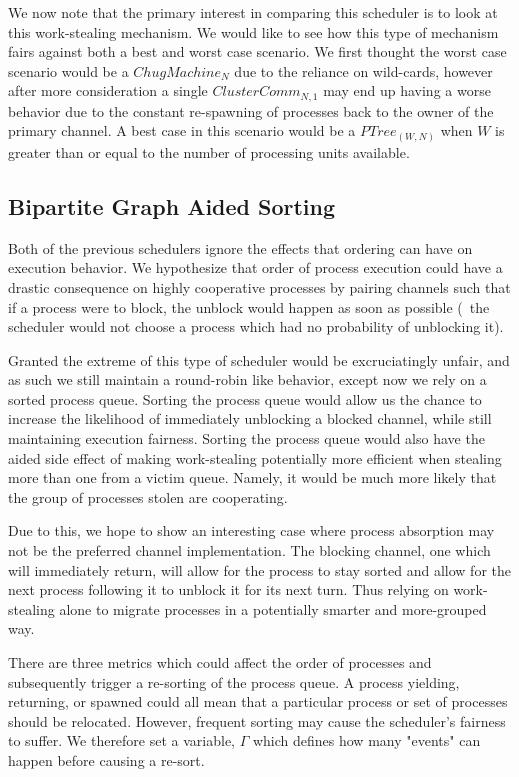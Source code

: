 We now note that the primary interest in comparing this scheduler is to look at 
this work-stealing mechanism.
We would like to see how this type of mechanism fairs against both a best and
worst case scenario. We first thought the worst case scenario would be a 
$ChugMachine_N$ due to the reliance on wild-cards, however after more 
consideration a single $ClusterComm_{N,1}$ may end up having a worse behavior
due to the constant re-spawning of processes back to the owner of the primary
channel. A best case in this scenario would be a $PTree_{(W,N)}$ when $W$ is greater than or equal
to the number of processing units available.

\subsection{Bipartite Graph Aided Sorting}
    \label{sec:bipartite graph aided sorting}

Both of the previous schedulers ignore the effects that ordering can have on
execution behavior. We hypothesize that order of process execution could have
a drastic consequence on highly cooperative processes by pairing channels such
that if a process were to block, the unblock would happen as soon as possible
(\ie~the scheduler would not choose a process which had no probability of
unblocking it).

Granted the extreme of this type of scheduler would be excruciatingly unfair, and
as such we still maintain a round-robin like behavior, except now we rely on 
a sorted process queue. Sorting the process queue would allow us the chance to 
increase the likelihood of immediately unblocking a blocked channel, while still
maintaining execution fairness. 
Sorting the process queue would also have the aided side effect of making 
work-stealing potentially more efficient when stealing more than one from a 
victim queue. Namely, it would be much more likely that the group of processes
stolen are cooperating. 

Due to this, we hope to show an interesting case where process absorption may 
not be the preferred channel implementation. The blocking channel, one which will
immediately return, will allow for the process to stay sorted and allow for the 
next process following it to unblock it for its next turn. Thus relying on 
work-stealing alone to migrate processes in a potentially smarter and 
more-grouped way.

There are three metrics which could affect the order of processes and
subsequently trigger a re-sorting of the process queue. A process yielding,
returning, or spawned could all mean that a particular process or set of
processes should be relocated. However, frequent sorting may cause the
scheduler's fairness to suffer. We therefore set a variable, $\Gamma$ which
defines how many "events" can happen before causing a re-sort.

